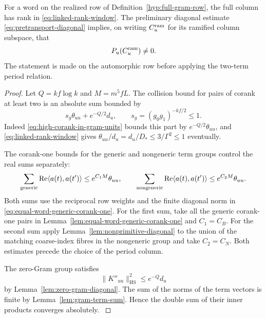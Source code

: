 \begin{proposition}\label{prop:pretransport-ramified-period}
For a word on the realized row of Definition~\ref{hyp:full-gram-row}, the full column has rank
in \eqref{eq:linked-rank-window}. The preliminary diagonal
estimate \eqref{eq:pretransport-diagonal} implies, on writing \(C_u^{\rm ram}\) for its ramified column subspace, that 
\[
 P_u(C_u^{\rm ram})\ne0.
\]
 The statement is
made on the automorphic row before applying the two-term
period relation.
\end{proposition}

\begin{proof}

Let \(Q=kf\log k\) and
\(M=m^5 f L\). The collision bound for pairs of corank at least two
is an absolute sum bounded by
\[
  s_g\theta_{uu}+e^{-Q/2}d_u,\qquad
  s_g=(g_0 g_1)^{-kf/2}\le1 .
\]
Indeed \eqref{eq:high-corank-in-gram-units} bounds this part by
\(e^{-Q/2}\theta_{uu}\), and \eqref{eq:linked-rank-window} gives
\(\theta_{uu}/d_u=d_u/D_*\le3/\Gamma^2\le1\) eventually.

The corank-one bounds for the generic and nongeneric term groups
control the real sums separately:
\[
 \sum_{\rm generic}\operatorname{Re}\langle a(t),a(t')\rangle\le e^{C_1M}\theta_{uu},
 \qquad
 \sum_{\rm nongeneric}\operatorname{Re}\langle a(t),a(t')\rangle\le e^{C_2M}\theta_{uu}.
\]
Both sums use the reciprocal row weights and the finite diagonal
norm in \eqref{eq:equal-word-generic-corank-one}. For the first
sum, take all the generic corank-one pairs in
Lemma~\ref{lem:equal-word-generic-corank-one} and \(C_1=C_B\).
For the second sum apply Lemma~\ref{lem:nonprimitive-diagonal}
to the union of the matching coarse-index fibres in the nongeneric
group and take \(C_2=C_N\). Both estimates precede the choice of
the period column.

The zero-Gram group satisfies
\[
       \|K''_{uu}\|_{\mathrm{HS}}^2\le e^{-Q}d_u
\]
by Lemma~\ref{lem:zero-gram-diagonal}. The sum of the norms of
the term vectors is finite by Lemma~\ref{lem:gram-term-sum}.
Hence the double sum of their inner products converges absolutely. \label{cor:selected-row-gram-3}



\end{proof}

